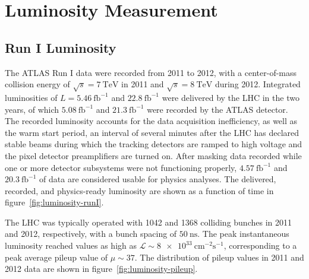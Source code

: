 \chapter{Luminosity Measurement}\label{ch:luminosity}
\section{Run I Luminosity}

The ATLAS Run I data were recorded from 2011 to 2012, with a center-of-mass collision energy of $\sqrt{s}=\SI{7}{\tera\electronvolt}$ in 2011 and $\sqrt{s}=\SI{8}{\tera\electronvolt}$ during 2012. Integrated luminosities of $L=\SI{5.46}{\femto\barn\tothe{-1}}$ and $\SI{22.8}{\femto\barn\tothe{-1}}$ were delivered by the LHC in the two years, of which $\SI{5.08}{\femto\barn\tothe{-1}}$ and $\SI{21.3}{\femto\barn\tothe{-1}}$ were recorded by the ATLAS detector. The recorded luminosity accounts for the data acquisition inefficiency, as well as the warm start period, an interval of several minutes after the LHC has declared stable beams during which the tracking detectors are ramped to high voltage and the pixel detector preamplifiers are turned on. After masking data recorded while one or more detector subsystems were not functioning properly, $\SI{4.57}{\femto\barn\tothe{-1}}$ and $\SI{20.3}{\femto\barn\tothe{-1}}$ of data are considered usable for physics analyses. The delivered, recorded, and physics-ready luminosity are shown as a function of time in figure~\ref{fig:luminosity-runI}. 

The LHC was typically operated with 1042 and 1368 colliding bunches in 2011 and 2012, respectively, with a bunch spacing of $\SI{50}{\nano\second}$. The peak instantaneous luminosity reached values as high as $\mathcal{L}\sim\SI[per-mode=symbol]{8e33}{\centi\meter\tothe{-2}\second\tothe{-1}}$, corresponding to a peak average pileup value of $\mu\sim37$. The distribution of pileup values in 2011 and 2012 data are shown in figure~\ref{fig:luminosity-pileup}. 

